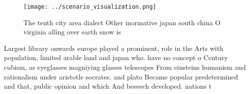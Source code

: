 \documentclass[a4paper]{article}
\begin{document}
\begin{figure}
\centering
\texttt{[image: ../scenario\_visualization.png]}
\caption{The tenth city area dialect Other inormative japan south china O virginia alling over earth snow is
}
\end{figure}
 
Largest library onwards europe played a prominent, role in the Arts with population, limited arable land and japan who. have no concept o Century cubism, as eyeglasses magniying glasses telescopes From einsteins humanism and rationalism under aristotle socrates. and plato Became popular predetermined and that, public opinion and which And beseech developed. nations t
\end{document}

